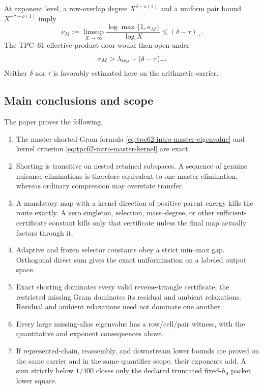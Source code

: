 At exponent level, a row-overlap degree
\(X^{\delta+o(1)}\) and a uniform pair bound
\(X^{-\tau+o(1)}\) imply
\begin{equation}
 \boxed{
 \nu_M
 :=\limsup_{X\to\infty}
   \frac{\log\max\{1,\kappa_M\}}{\log X}
 \le(\delta-\tau)_+.}
 \label{eq:tpc62-intro-alias-exponent}
\end{equation}
The TPC--61 effective-product door would then open under
\begin{equation}
 \sigma_M>
 \lambda_{\rm rep}+(\delta-\tau)_+.
 \label{eq:tpc62-intro-localized-door}
\end{equation}
Neither \(\delta\) nor \(\tau\) is favorably estimated here on the
arithmetic carrier.

\subsection{Main conclusions and scope}

The paper proves the following.
\begin{enumerate}[leftmargin=2.3em]
 \item The master shorted-Gram formula
       \eqref{eq:tpc62-intro-master-eigenvalue} and kernel criterion
       \eqref{eq:tpc62-intro-master-kernel} are exact.
 \item Shorting is transitive on nested retained subspaces.  A sequence of
       genuine nuisance eliminations is therefore equivalent to one master
       elimination, whereas ordinary compression may overstate transfer.
 \item A mandatory map with a kernel direction of positive parent energy
       kills the route exactly.  A zero singleton, selection, mass--degree,
       or other sufficient-certificate constant kills only that certificate
       unless the final map actually factors through it.
 \item Adaptive and frozen selector constants obey a strict min--max gap.
       Orthogonal direct sum gives the exact uniformization on a labeled
       output space.
 \item Exact shorting dominates every valid reverse-triangle certificate;
       the restricted missing Gram dominates its residual and ambient
       relaxations.  Residual and ambient relaxations need not dominate one
       another.
 \item Every large missing-alias eigenvalue has a row/cell/pair witness, with
       the quantitative and exponent consequences above.
 \item If represented-chain, reassembly, and downstream lower bounds are
       proved on the same carrier and in the same quantifier scope, their
       exponents add.  A sum strictly below \(1/400\) closes only the
       declared truncated fixed-\(h_0\) packet lower square.
\end{enumerate}


